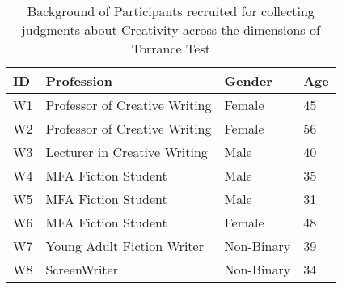 \begin{table}[!ht]
\centering
\small
\begin{tabular}{|l|l|l|l|}
\hline
ID & Profession  & Gender & Age                \\ \hline
W1 & Professor of Creative Writing & Female & 45 \\ \hline
W2 & Professor of Creative Writing & Female & 56 \\ \hline
W3 & Lecturer in Creative Writing & Male & 40  \\ \hline
W4 & MFA Fiction Student & Male & 35        \\ \hline
W5 & MFA Fiction Student & Male & 31      \\ \hline
W6 & MFA Fiction Student & Female & 48         \\ \hline
W7 & Young Adult Fiction Writer  & Non-Binary & 39                      \\ \hline
W8 & ScreenWriter & Non-Binary & 34                  \\ \hline
\end{tabular}
\vspace{2ex}
\caption{\label{surveyprof}Background of Participants recruited for collecting judgments about Creativity across the dimensions of Torrance Test}
\end{table}

